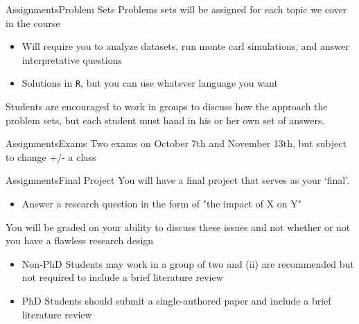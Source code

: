 \documentclass[aspectratio=169,t,11pt,table]{beamer}
\begin{document}
\begin{frame}{Assignments}{Problem Sets}
  Problems sets will be assigned for each topic we cover in the course
  \begin{itemize}
    \item Will require you to analyze datasets, run monte carl simulations, and answer interpretative questions
    \item Solutions in \texttt{R}, but you can use whatever language you want
  \end{itemize}

  \bigskip
  Students are encouraged to work in groups to discuss how the approach the problem sets, but each student must hand in his or her own set of answers. 
\end{frame}

\begin{frame}{Assignments}{Exams}
  Two exams on October 7th and November 13th, but subject to change +/- a class
\end{frame}

\begin{frame}{Assignments}{Final Project}
  You will have a final project that serves as your `final'.
  \begin{itemize}
    \item Answer a research question in the form of "the impact of X on Y"
  \end{itemize}  

  \bigskip
  You will be graded on your ability to discuss these issues and not whether or not you have a flawless research design
  \begin{itemize}
    \item Non-PhD Students may work in a group of two and (ii) are recommended but not required to include a brief literature review

    \item PhD Students should submit a single-authored paper and include a brief literature review
  \end{itemize}
\end{frame}
\end{document}
